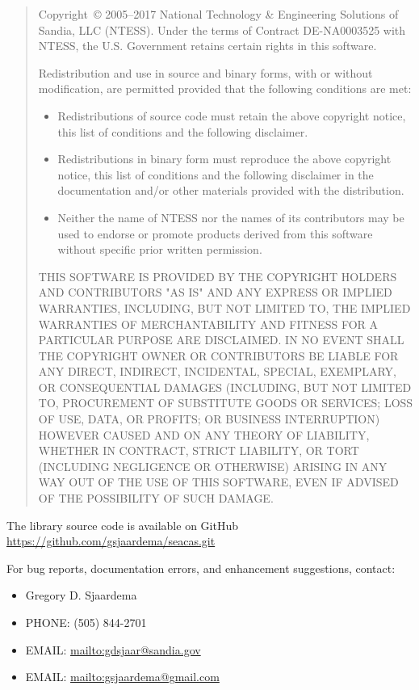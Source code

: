 \begin{quote}
Copyright~\copyright{} 2005--2017 National Technology \& Engineering Solutions
of Sandia, LLC (NTESS).  Under the terms of Contract DE-NA0003525 with
NTESS, the U.S. Government retains certain rights in this software.

Redistribution and use in source and binary forms, with or without
modification, are permitted provided that the following conditions are
met:

\begin{itemize}
\item Redistributions of source code must retain the above copyright
      notice, this list of conditions and the following disclaimer.

\item Redistributions in binary form must reproduce the above
      copyright notice, this list of conditions and the following
      disclaimer in the documentation and/or other materials provided
      with the distribution.

\item Neither the name of NTESS nor the names of its
      contributors may be used to endorse or promote products derived
      from this software without specific prior written permission.
\end{itemize}

THIS SOFTWARE IS PROVIDED BY THE COPYRIGHT HOLDERS AND CONTRIBUTORS
"AS IS" AND ANY EXPRESS OR IMPLIED WARRANTIES, INCLUDING, BUT NOT
LIMITED TO, THE IMPLIED WARRANTIES OF MERCHANTABILITY AND FITNESS FOR
A PARTICULAR PURPOSE ARE DISCLAIMED. IN NO EVENT SHALL THE COPYRIGHT
OWNER OR CONTRIBUTORS BE LIABLE FOR ANY DIRECT, INDIRECT, INCIDENTAL,
SPECIAL, EXEMPLARY, OR CONSEQUENTIAL DAMAGES (INCLUDING, BUT NOT
LIMITED TO, PROCUREMENT OF SUBSTITUTE GOODS OR SERVICES; LOSS OF USE,
DATA, OR PROFITS; OR BUSINESS INTERRUPTION) HOWEVER CAUSED AND ON ANY
THEORY OF LIABILITY, WHETHER IN CONTRACT, STRICT LIABILITY, OR TORT
(INCLUDING NEGLIGENCE OR OTHERWISE) ARISING IN ANY WAY OUT OF THE USE
OF THIS SOFTWARE, EVEN IF ADVISED OF THE POSSIBILITY OF SUCH DAMAGE.
\end{quote}

The \exo{} library source code is available on GitHub
\url{https://github.com/gsjaardema/seacas.git}

For bug reports, documentation errors, and enhancement suggestions,
contact:
\begin{itemize}
   \item Gregory D. Sjaardema
   \item PHONE: (505) 844-2701
   \item EMAIL: \url{mailto:gdsjaar@sandia.gov}
   \item EMAIL: \url{mailto:gsjaardema@gmail.com}
\end{itemize}
